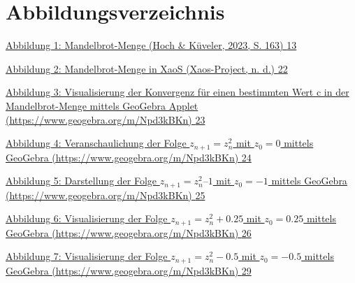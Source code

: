 \documentclass[a4paper, 12pt]{book}
\begin{document}
\section{Abbildungsverzeichnis}\label{abbildungsverzeichnis}

\protect\hyperlink{_Toc167901651}{Abbildung 1: Mandelbrot-Menge (Hoch \&
Küveler, 2023, S. 163) \protect\hyperlink{_Toc167901651}{13}}

\protect\hyperlink{_Toc167901652}{Abbildung 2: Mandelbrot-Menge in XaoS
(Xaos-Project, n. d.) \protect\hyperlink{_Toc167901652}{22}}

\protect\hyperlink{_Toc167901653}{Abbildung 3: Visualisierung der
Konvergenz für einen bestimmten Wert c in der Mandelbrot-Menge mittels
GeoGebra Applet (https://www.geogebra.org/m/Npd3kBKn)
\protect\hyperlink{_Toc167901653}{23}}

\protect\hyperlink{_Toc167901654}{Abbildung 4: Veranschaulichung der
Folge \(z_{n + 1} = z_{n}^{2}\) mit \(z_{0} = 0\) mittels
GeoGebra (https://www.geogebra.org/m/Npd3kBKn)
\protect\hyperlink{_Toc167901654}{24}}

\protect\hyperlink{_Toc167901655}{Abbildung 5: Darstellung der Folge
\(z_{n + 1} = z_{n}^{2}–1\) mit \({z}_{0} =  - 1\) mittels
GeoGebra (https://www.geogebra.org/m/Npd3kBKn)
\protect\hyperlink{_Toc167901655}{25}}

\protect\hyperlink{_Toc167901656}{Abbildung 6: Visualisierung der Folge
\(z_{n + 1} = z_{n}^{2} + 0.25\) mit \(z_{0} = 0.25\)
mittels GeoGebra (https://www.geogebra.org/m/Npd3kBKn)
\protect\hyperlink{_Toc167901656}{26}}

\protect\hyperlink{_Toc167901657}{Abbildung 7: Visualisierung der Folge
\(z_{n + 1} = z_{n}^{2} - 0.5\) mit \(z_{0} =  - 0.5\)
mittels GeoGebra (https://www.geogebra.org/m/Npd3kBKn)
\protect\hyperlink{_Toc167901657}{29}}
\end{document}
